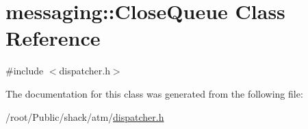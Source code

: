 \hypertarget{classmessaging_1_1CloseQueue}{\section{messaging\-:\-:Close\-Queue Class Reference}
\label{classmessaging_1_1CloseQueue}
}


{\ttfamily \#include $<$dispatcher.\-h$>$}



The documentation for this class was generated from the following file\-:\begin{DoxyCompactItemize}
\item 
/root/\-Public/shack/atm/\hyperlink{dispatcher_8h}{dispatcher.\-h}\end{DoxyCompactItemize}

